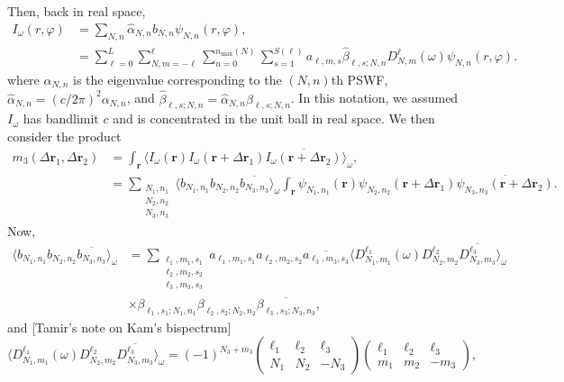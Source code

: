 \documentclass{amsart}
\theoremstyle{definition}
\theoremstyle{remark}
\numberwithin{equation}{section}
\newcommand{\rr}{\mathbf{r}}
\begin{document}
Then, back in real space,
\[\begin{aligned} I_{\omega}(r,\varphi) &= \sum_{N,n}\widehat{\alpha}_{N,n}b_{N,n}\psi_{N,n}(r,\varphi),\\
&= \sum_{\ell=0}^L\sum_{N,m=-\ell}^{\ell}\sum_{n=0}^{n_{\text{max}}(N)}\sum_{s=1}^{S(\ell)}a_{\ell,m,s}\widehat\beta_{\ell,s;N,n}D_{N,m}^{\ell}(\omega)\psi_{N,n}(r,\varphi).
\end{aligned}\]
where $\alpha_{N,n}$ is the eigenvalue corresponding to the $(N,n)$th PSWF, $\widehat{\alpha}_{N,n} = (c/2\pi)^2\alpha_{N,n}$, and $\widehat\beta_{\ell,s;N,n}=\widehat\alpha_{N,n}\beta_{\ell,s;N,n}$. In this notation, we assumed $I_{\omega}$ has bandlimit $c$ and is concentrated in the unit ball in real space. We then consider the product
\[\begin{aligned} m_3(\Delta\rr_1,\Delta\rr_2) &= \int_{\rr}\langle I_{\omega}(\rr)I_{\omega}(\rr+\Delta\rr_1)\overline{I_{\omega}(\rr+\Delta\rr_2)}\rangle_{\omega},\\
&= \sum_{\substack{N_1,n_1\\N_2,n_2\\N_3,n_3}} \langle b_{N_1,n_1}b_{N_2,n_2}\overline{b_{N_3,n_3}}\rangle_{\omega}\int_{\rr}\psi_{N_1,n_1}(\rr)\psi_{N_2,n_2}(\rr+\Delta\rr_1)\overline{\psi_{N_3,n_3}(\rr+\Delta\rr_2)}.\end{aligned}\]
Now,
\[\begin{aligned} \langle b_{N_1,n_1}b_{N_2,n_2}\overline{b_{N_3,n_3}}\rangle_{\omega} &= \sum_{\substack{\ell_1,m_1,s_1\\\ell_2,m_2,s_2\\\ell_3,m_3,s_3}}a_{\ell_1,m_1,s_1}a_{\ell_2,m_2,s_2}\overline{a_{\ell_3,m_3,s_3}}\langle D_{N_1,m_1}^{\ell_1}(\omega)D_{N_2,m_2}^{\ell_2}\overline{D_{N_3,m_3}^{\ell_3}}\rangle_{\omega}\\
&\times \beta_{\ell_1,s_1;N_1,n_1}\beta_{\ell_2,s_2;N_2,n_2}\overline{\beta_{\ell_3,s_3;N_3,n_3}},\end{aligned}\]
and [Tamir's note on Kam's bispectrum]
\[ \langle D_{N_1,m_1}^{\ell_1}(\omega)D_{N_2,m_2}^{\ell_2}\overline{D_{N_3,m_3}^{\ell_3}}\rangle_{\omega} = (-1)^{N_3+m_3}\left(\begin{array}{ccc}\ell_1 & \ell_2  & \ell_3\\ N_1 & N_2 & -N_3\end{array}\right)\left(\begin{array}{ccc}\ell_1 & \ell_2  & \ell_3\\ m_1 & m_2 & -m_3\end{array}\right),\
\]
\end{document}
